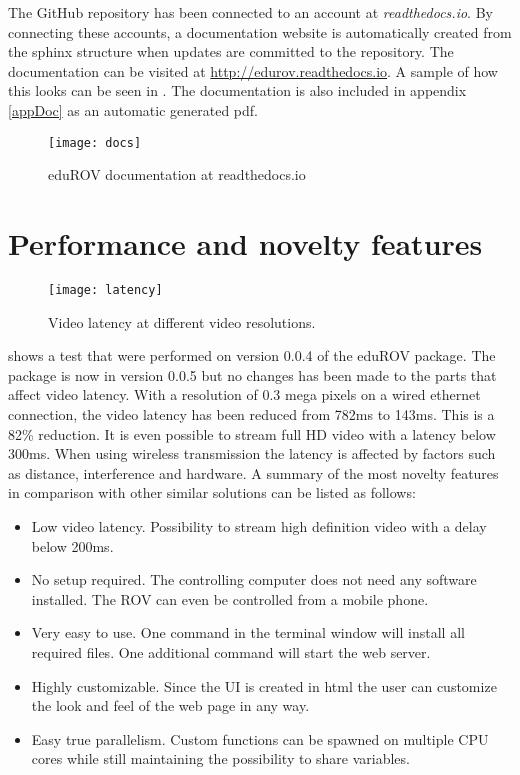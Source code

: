 The GitHub repository has been connected to an account at \emph{readthedocs.io}. By connecting these accounts, a documentation website is automatically created from the sphinx structure when updates are committed to the repository. The documentation can be visited at \url{http://edurov.readthedocs.io}. A sample of how this looks can be seen in . The documentation is also included in appendix \ref{appDoc} as an automatic generated pdf.

\begin{figure}[h!]
    \centering
    \texttt{[image: docs]}
    \caption{eduROV documentation at readthedocs.io}
    \label{docs}
\end{figure}

\section{Performance and novelty features}

\begin{figure}[h!]
    \centering
    \texttt{[image: latency]}
    \caption{Video latency at different video resolutions.}
    \label{latency}
\end{figure}

 shows a test that were performed on version 0.0.4 of the eduROV package. The package is now in version 0.0.5 but no changes has been made to the parts that affect video latency. With a resolution of 0.3 mega pixels on a wired ethernet connection, the video latency has been reduced from 782ms to 143ms. This is a 82\% reduction. It is even possible to stream full HD video with a latency below 300ms. When using wireless transmission the latency is affected by factors such as distance, interference and hardware. A summary of the most novelty features in comparison with other similar solutions can be listed as follows:

\begin{itemize}
\item Low video latency. Possibility to stream high definition video with a delay below 200ms.

\item No setup required. The controlling computer does not need any software installed. The ROV can even be controlled from a mobile phone.

\item Very easy to use. One command in the terminal window will install all required files. One additional command will start the web server.

\item Highly customizable. Since the UI is created in html the user can customize the look and feel of the web page in any way.

\item Easy true parallelism. Custom functions can be spawned on multiple CPU cores while still maintaining the possibility to share variables.

\end{itemize}

